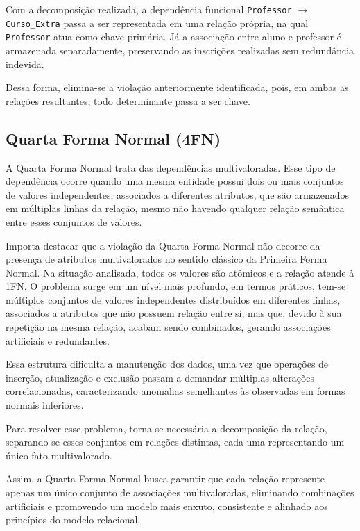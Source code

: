 \begin{tcolorbox}[breakable, colback=blue!5,colframe=blue!40!black,title=Situação exemplo]
\justify

Com a decomposição realizada, a dependência funcional \texttt{Professor} $\rightarrow$ \texttt{Curso\_Extra} passa a ser representada em uma relação própria, na qual \texttt{Professor} atua como chave primária. Já a associação entre aluno e professor é armazenada separadamente, preservando as inscrições realizadas sem redundância indevida.

Dessa forma, elimina-se a violação anteriormente identificada, pois, em ambas as relações resultantes, todo determinante passa a ser chave.
\end{tcolorbox}

\subsection{Quarta Forma Normal (4FN)}

A Quarta Forma Normal trata das dependências multivaloradas. Esse tipo de dependência ocorre quando uma mesma entidade possui dois ou mais conjuntos de valores independentes, associados a diferentes atributos, que são armazenados em múltiplas linhas da relação, mesmo não havendo qualquer relação semântica entre esses conjuntos de valores.

Importa destacar que a violação da Quarta Forma Normal não decorre da presença de atributos multivalorados no sentido clássico da Primeira Forma Normal. Na situação analisada, todos os valores são atômicos e a relação atende à 1FN. O problema surge em um nível mais profundo, em termos práticos, tem-se múltiplos conjuntos de valores independentes distribuídos em diferentes linhas, associados a atributos que não possuem relação entre si, mas que, devido à sua repetição na mesma relação, acabam sendo combinados, gerando associações artificiais e redundantes.

Essa estrutura dificulta a manutenção dos dados, uma vez que operações de inserção, atualização e exclusão passam a demandar múltiplas alterações correlacionadas, caracterizando anomalias semelhantes às observadas em formas normais inferiores.

Para resolver esse problema, torna-se necessária a decomposição da relação, separando-se esses conjuntos em relações distintas, cada uma representando um único fato multivalorado.

Assim, a Quarta Forma Normal busca garantir que cada relação represente apenas um único conjunto de associações multivaloradas, eliminando combinações artificiais e promovendo um modelo mais enxuto, consistente e alinhado aos princípios do modelo relacional.

